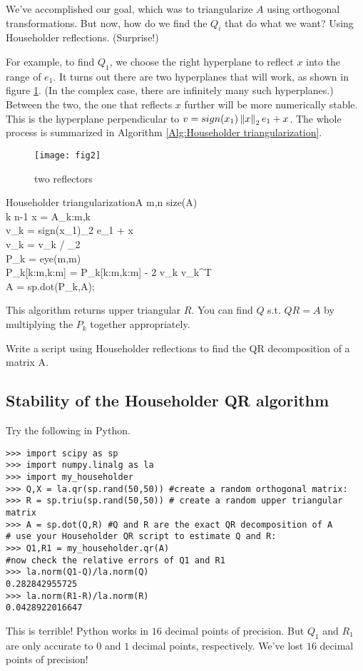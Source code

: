 We've accomplished our goal, which was to triangularize $A$ using orthogonal transformations.
But now, how do we find the $Q_i$ that do what we want? Using Householder reflections.
(Surprise!)

For example, to find $Q_1$, we choose the right hyperplane to reflect $x$ into the range of $e_1$.
It turns out there are two hyperplanes that will work, as shown in figure \ref{fig:two reflectors}.
(In the complex case, there are infinitely many such hyperplanes.)
Between the two, the one that reflects $x$ further will be more numerically stable.
This is the hyperplane perpendicular to \textbf{$v = sign(x_1)\left\lVert x\right\rVert_2 e_1 + x$}.
The whole process is summarized in Algorithm \ref{Alg:Householder triangularization}.

\begin{figure}
	\centering
	\texttt{[image: fig2]}
	\caption{two reflectors}
	\label{fig:two reflectors}
\end{figure}

\begin{pseudo}{Householder triangularization}{A}
\label{Alg:Householder triangularization}
m,n \GETS size(A)\\
\FOR k  \TO n-1 \DO
\BEGIN
   x = A_{k:m,k}\\
   v_k = sign(x_1)_2 e_1 + x\\
   v_k = v_k / _2\\
   P_k = eye(m,m)\\
   P_k[k:m,k:m] = P_k[k:m,k:m] - 2 v_k v_k^T\\
   A = sp.dot(P_k,A);
\END
\end{pseudo}

This algorithm returns upper triangular $R$. You can find $Q$ s.t. $QR = A$ by multiplying the $P_k$ together appropriately.

\begin{problem}
\label{prob:HouseholderQR}
Write a script using Householder reflections to find the QR decomposition of a matrix A.
\end{problem}

\subsection*{Stability of the Householder QR algorithm}

Try the following in Python.

\begin{lstlisting}
>>> import scipy as sp
>>> import numpy.linalg as la
>>> import my_householder
>>> Q,X = la.qr(sp.rand(50,50)) #create a random orthogonal matrix:
>>> R = sp.triu(sp.rand(50,50)) # create a random upper triangular matrix
>>> A = sp.dot(Q,R) #Q and R are the exact QR decomposition of A
# use your Householder QR script to estimate Q and R:
>>> Q1,R1 = my_householder.qr(A)
#now check the relative errors of Q1 and R1
>>> la.norm(Q1-Q)/la.norm(Q)
0.282842955725
>>> la.norm(R1-R)/la.norm(R)
0.0428922016647
\end{lstlisting}
This is terrible! 
Python works in $16$ decimal points of precision.
But $Q_1$ and $R_1$ are only accurate to $0$ and $1$ decimal points, respectively.
We've lost $16$ decimal points of precision!

